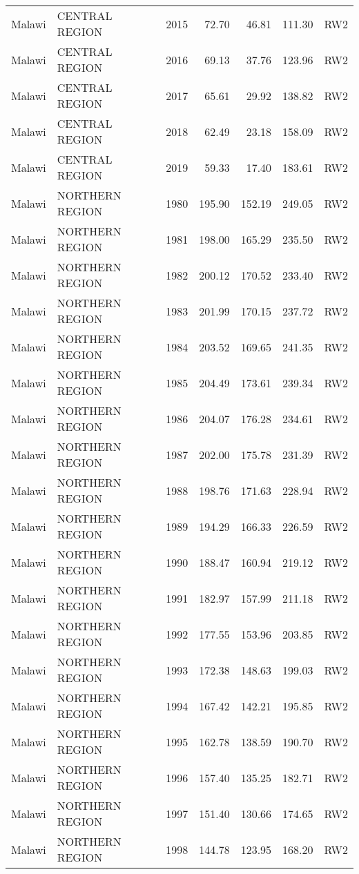 \begin{longtable}{lllrrrl}
  Malawi & CENTRAL REGION & 2015 & 72.70 & 46.81 & 111.30 & RW2 \\ 
  Malawi & CENTRAL REGION & 2016 & 69.13 & 37.76 & 123.96 & RW2 \\ 
  Malawi & CENTRAL REGION & 2017 & 65.61 & 29.92 & 138.82 & RW2 \\ 
  Malawi & CENTRAL REGION & 2018 & 62.49 & 23.18 & 158.09 & RW2 \\ 
  Malawi & CENTRAL REGION & 2019 & 59.33 & 17.40 & 183.61 & RW2 \\ 
  Malawi & NORTHERN REGION & 1980 & 195.90 & 152.19 & 249.05 & RW2 \\ 
  Malawi & NORTHERN REGION & 1981 & 198.00 & 165.29 & 235.50 & RW2 \\ 
  Malawi & NORTHERN REGION & 1982 & 200.12 & 170.52 & 233.40 & RW2 \\ 
  Malawi & NORTHERN REGION & 1983 & 201.99 & 170.15 & 237.72 & RW2 \\ 
  Malawi & NORTHERN REGION & 1984 & 203.52 & 169.65 & 241.35 & RW2 \\ 
  Malawi & NORTHERN REGION & 1985 & 204.49 & 173.61 & 239.34 & RW2 \\ 
  Malawi & NORTHERN REGION & 1986 & 204.07 & 176.28 & 234.61 & RW2 \\ 
  Malawi & NORTHERN REGION & 1987 & 202.00 & 175.78 & 231.39 & RW2 \\ 
  Malawi & NORTHERN REGION & 1988 & 198.76 & 171.63 & 228.94 & RW2 \\ 
  Malawi & NORTHERN REGION & 1989 & 194.29 & 166.33 & 226.59 & RW2 \\ 
  Malawi & NORTHERN REGION & 1990 & 188.47 & 160.94 & 219.12 & RW2 \\ 
  Malawi & NORTHERN REGION & 1991 & 182.97 & 157.99 & 211.18 & RW2 \\ 
  Malawi & NORTHERN REGION & 1992 & 177.55 & 153.96 & 203.85 & RW2 \\ 
  Malawi & NORTHERN REGION & 1993 & 172.38 & 148.63 & 199.03 & RW2 \\ 
  Malawi & NORTHERN REGION & 1994 & 167.42 & 142.21 & 195.85 & RW2 \\ 
  Malawi & NORTHERN REGION & 1995 & 162.78 & 138.59 & 190.70 & RW2 \\ 
  Malawi & NORTHERN REGION & 1996 & 157.40 & 135.25 & 182.71 & RW2 \\ 
  Malawi & NORTHERN REGION & 1997 & 151.40 & 130.66 & 174.65 & RW2 \\ 
  Malawi & NORTHERN REGION & 1998 & 144.78 & 123.95 & 168.20 & RW2 \\ 

\end{longtable}

